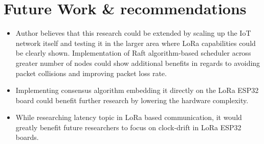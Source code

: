 \documentclass[oneside,12pt]{book}
\begin{document}
\section{Future Work \& recommendations}
\begin{itemize}
  \item Author believes that this research could be extended by scaling up the IoT network itself and testing it in the larger area where LoRa capabilities could be clearly shown. Implementation of Raft algorithm-based scheduler across greater number of nodes could show additional benefits in regards to avoiding packet collisions and improving packet loss rate.  
  \item Implementing consensus algorithm embedding it directly on the LoRa ESP32 board could benefit further research by lowering the hardware complexity.
  \item While researching latency topic in LoRa based communication, it would greatly benefit future researchers to focus on clock-drift in LoRa ESP32 boards. 
\end{itemize}






\appendix
\end{document}
